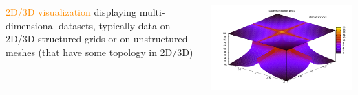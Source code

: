 \begin{frame}
\begin{columns}
\begin{column}{7cm}
\begin{beamerboxesrounded}[upper=block head,lower=block body,shadow=true]{\textcolor{DarkBlue}{} \textcolor{DarkOrange}{2D/3D visualization} }
        displaying multi-dimensional datasets, typically
data on 2D/3D structured grids or on unstructured meshes (that have
some topology in 2D/3D)
\end{beamerboxesrounded}
\end{column}
\begin{column}{5cm}
        \includegraphics[width=1.1\columnwidth]{figs/plots/others/pm3dplot}
\end{column}
\end{columns}

\end{frame}


